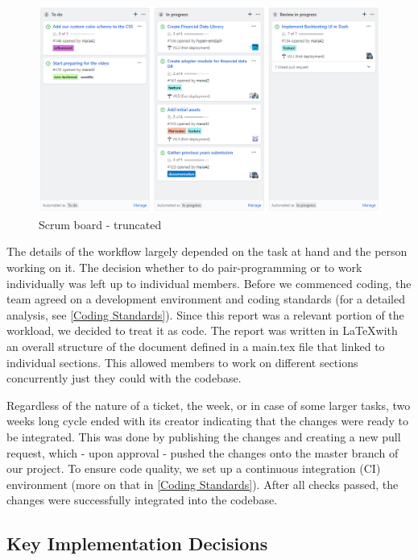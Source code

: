 \documentclass[main.tex]{subfiles}
\begin{document}
\begin{figure}[H]
   \centering
   \includegraphics[width=\textwidth]{05Coding/05Pictures/scrumboard.png}
   \caption{Scrum board - truncated}
   \label{Scrum}
\end{figure}

The details of the workflow largely depended on the task at hand and the person working on it. The decision whether to do pair-programming or to work individually was left up to individual members. Before we commenced coding, the team agreed on a development environment and coding standards (for a detailed analysis, see \ref{Coding Standards}). Since this report was a relevant portion of the workload, we decided to treat it as code. The report was written in \LaTeX with an overall structure of the document defined in a main.tex file that linked to individual sections. This allowed members to work on different sections concurrently just they could with the codebase.

Regardless of the nature of a ticket, the week, or in case of some larger tasks, two weeks long cycle ended with its creator indicating that the changes were ready to be integrated. This was done by publishing the changes and creating a new pull request, which - upon approval - pushed the changes onto the master branch of our project. To ensure code quality, we set up a continuous integration (CI) environment (more on that in \ref{Coding Standards}). After all checks passed, the changes were successfully integrated into the codebase.

\subsection{Key Implementation Decisions}
\end{document}
